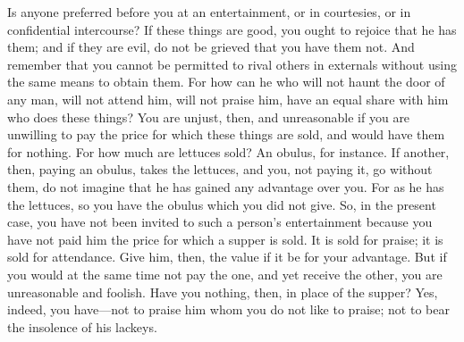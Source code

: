 Is anyone preferred before you at an entertainment, or in courtesies, or
in confidential intercourse? If these things are good, you ought to
rejoice that he has them; and if they are evil, do not be grieved that
you have them not. And remember that you cannot be permitted to rival
others in externals without using the same means to obtain them. For how
can he who will not haunt the door of any man, will not attend him, will
not praise him, have an equal share with him who does these things? You
are unjust, then, and unreasonable if you are unwilling to pay the price
for which these things are sold, and would have them for nothing. For how
much are lettuces sold? An obulus, for instance. If another, then, paying
an obulus, takes the lettuces, and you, not paying it, go without them,
do not imagine that he has gained any advantage over you. For as he has
the lettuces, so you have the obulus which you did not give. So, in the
present case, you have not been invited to such a person's entertainment
because you have not paid him the price for which a supper is sold. It is
sold for praise; it is sold for attendance. Give him, then, the value if
it be for your advantage. But if you would at the same time not pay the
one, and yet receive the other, you are unreasonable and foolish. Have
you nothing, then, in place of the supper? Yes, indeed, you have---not to
praise him whom you do not like to praise; not to bear the insolence of
his lackeys.

